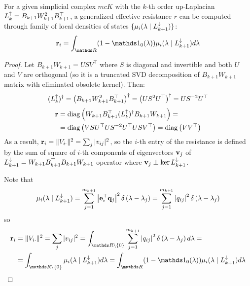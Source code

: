 \documentclass{mynotes}
\begin{document}
\begin{thm}
      For a given simplicial complex \( mc K \) with the \(k\)-th order up-Laplacian \( L_{k}^{\uparrow} = B_{k+1} W_{k+1}^2 B_{k+1}^\top\), a generalized effective resistance \( r \) can be computed through family of local densities of states \( \{ \mu_i(\lambda \mid L_{k+1 }^{\downarrow}) \} \):
      \begin{equation}
            \b r_i = \int_{\ds R } (1 - \ds 1_0(\lambda)) \mu_i ( \lambda \mid \Ld {k+1} ) d\lambda 
      \end{equation}
\end{thm}
\begin{proof}
      Let \( B_{k+1} W_{k+1} = U S V^\top\) where \( S \) is diagonal and invertible and both \( U \) and \( V \) are orthogonal (so it is a truncated SVD decomposition of \( B_{k+1} W_{k+1} \) matrix with eliminated obsolete kernel). Then:
      \begin{equation}
            ( L_{k}^{\uparrow} )^\dagger = \left( B_{k+1} W_{k+1}^2 B_{k+1}^\top \right)^\dagger = \left( U S^2 U^\top \right)^\dagger = U S^{-2} U^\top
      \end{equation}
      \begin{equation}
            \begin{aligned}
                  \mathbf{r} & = \operatorname{diag} \left( W_{k+1} B_{k+1}^\top ( L_{k}^{\uparrow} )^\dagger B_{k+1} W_{k+1} \right)  =  \\
                  & = \operatorname{diag} \left(  V S U^\top U S^{-2} U^\top U S V^\top \right) = \operatorname{diag} \left(  V V^\top \right)
            \end{aligned}
      \end{equation}
      As a result, \( \mathbf{r}_i = \| V_{ i \cdot } \|^2 = \sum_j | v_{ij} |^2  \), so the \(i\)-th entry of the resistance is defined by the sum of square of \(i\)-th components of eigenvectors \( \mathbf{v}_j \) of \( L_{k+1}^{\downarrow} = W_{k+1} B_{k+1}^\top B_{k+1} W_{k+1} \) operator where \( \mathbf{v}_j \perp \ker L_{k+1}^{\downarrow} \).

      Note that 
      \begin{equation}
            \mu_i ( \lambda \mid L_{k+1}^{\downarrow} ) = \sum_{j=1}^{m_{k+1}} \left| \mathbf{e}_i^\top \mathbf{q}_j \right|^2 \delta \left( \lambda - \lambda_j \right)  = \sum_{j=1}^{m_{k+1}} \left| q_{ij} \right|^2 \delta \left( \lambda - \lambda_j \right) 
      \end{equation}
      so 
      \begin{equation}
            \begin{aligned}
                  \b r_i & = \| V_{ i \cdot } \|^2 = \sum_j | v_{ij} |^2 = \int_{ \ds R \backslash \{ 0 \} }  \sum_{j=1}^{m_{k+1}} \left| q_{ij} \right|^2 \delta \left( \lambda - \lambda_j \right)  d\lambda =\\
                  & = \int_{ \ds R \backslash \{ 0 \} } \mu_i ( \lambda \mid \Ld {k+1} ) d\lambda = \int_{\ds R } (1 - \ds 1_0(\lambda)) \mu_i ( \lambda \mid \Ld {k+1} ) d\lambda
            \end{aligned}
      \end{equation}
\end{proof}
\end{document}
